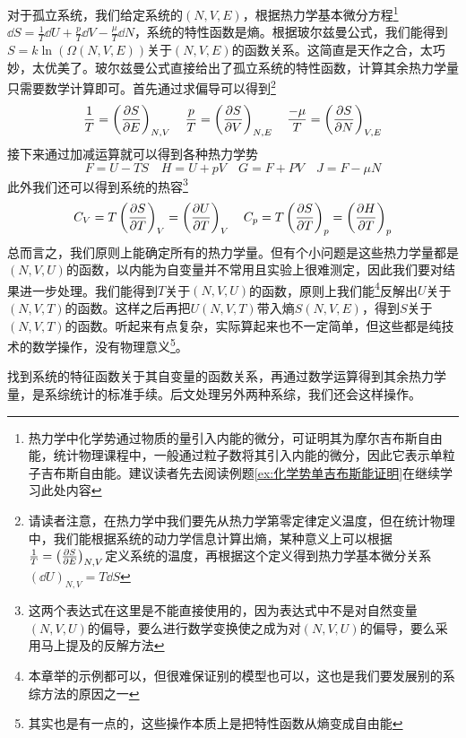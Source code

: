 \documentclass[../../main.tex]{subfiles}
\begin{document}
对于孤立系统，我们给定系统的\((N,V,E)\)，根据热力学基本微分方程\footnote{热力学中化学势通过物质的量引入内能的微分，可证明其为摩尔吉布斯自由能，统计物理课程中，一般通过粒子数将其引入内能的微分，因此它表示单粒子吉布斯自由能。建议读者先去阅读例题\ref{ex:化学势单吉布斯能证明}在继续学习此处内容}\(\dd S=\frac{1}{T}\dd U+\frac{p}{T}\dd V-\frac{\mu}{T}\dd N\)，系统的特性函数是熵。根据玻尔兹曼公式，我们能得到\(S=k\ln(\Omega(N,V,E))\)关于\((N,V,E)\)的函数关系。这简直是天作之合，太巧妙，太优美了。玻尔兹曼公式直接给出了孤立系统的特性函数，计算其余热力学量只需要数学计算即可。首先通过求偏导可以得到\footnote{请读者注意，在热力学中我们要先从热力学第零定律定义温度，但在统计物理中，我们能根据系统的动力学信息计算出熵，某种意义上可以根据\(\frac{1}{T}=\left(\pdv{S}{E}\right)_{N,V}\)定义系统的温度，再根据这个定义得到热力学基本微分关系\(\left(\dd U\right)_{N,V}=T\dd S\)}
\begin{equation}
    \frac{1}{T}=\left(\pdv{S}{E}\right)_{N,V}\quad \frac{p}{T}=\left(\pdv{S}{V}\right)_{N,E}\quad \frac{-\mu}{T}=\left(\pdv{S}{N}\right)_{V,E}
\end{equation}
接下来通过加减运算就可以得到各种热力学势
\begin{equation}
    F=U-TS\quad H=U+pV\quad G=F+PV\quad J=F-\mu N
\end{equation}
此外我们还可以得到系统的热容\footnote{这两个表达式在这里是不能直接使用的，因为表达式中不是对自然变量\((N,V,U)\)的偏导，要么进行数学变换使之成为对\((N,V,U)\)的偏导，要么采用马上提及的反解方法}
\begin{equation}
    C_V=T\left(\pdv{S}{T}\right)_V=\left(\pdv{U}{T}\right)_V \quad C_p=T\left(\pdv{S}{T}\right)_p=\left(\pdv{H}{T}\right)_p
\end{equation}
总而言之，我们原则上能确定所有的热力学量。但有个小问题是这些热力学量都是\((N,V,U)\)的函数，以内能为自变量并不常用且实验上很难测定，因此我们要对结果进一步处理。我们能得到\(T\)关于\((N,V,U)\)的函数，原则上我们能\footnote{本章举的示例都可以，但很难保证别的模型也可以，这也是我们要发展别的系综方法的原因之一}反解出\(U\)关于\((N,V,T)\)的函数。这样之后再把\(U(N,V,T)\)带入熵\(S(N,V,E)\)，得到\(S\)关于\((N,V,T)\)的函数。听起来有点复杂，实际算起来也不一定简单，但这些都是纯技术的数学操作，没有物理意义\footnote{其实也是有一点的，这些操作本质上是把特性函数从熵变成自由能}。

找到系统的特征函数关于其自变量的函数关系，再通过数学运算得到其余热力学量，是系综统计的标准手续。后文处理另外两种系综，我们还会这样操作。
\end{document}
